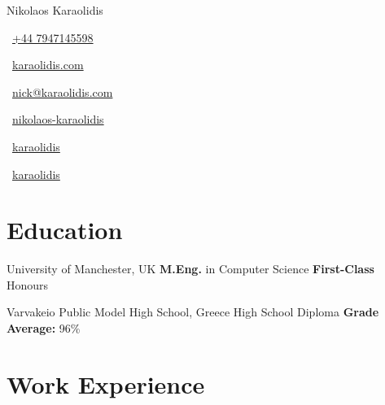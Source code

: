\documentclass[]{prometheus_cv}
\begin{document}
\thispagestyle{empty}
\pagestyle{fancy}

\centering

\begin{huge}
    Nikolaos Karaolidis
\end{huge}

\begin{footnotesize}
    \begin{tiny}\faMobile*\end{tiny}~\href{tel:+447947145598}{+44 7947145598}
    \quad
    \begin{tiny}\faHome\end{tiny}~\href{www.karaolidis.com}{karaolidis.com}
    \quad
    \begin{tiny}\faEnvelope\end{tiny}~\href{mailto:nick@karaolidis.com}{nick@karaolidis.com}
    \quad
    \begin{tiny}\faLinkedinIn\end{tiny}~\href{https://www.linkedin.com/in/nikolaos-karaolidis/}{nikolaos-karaolidis}
    \quad
    \begin{tiny}\faGitlab\end{tiny}~\href{https://git.karaolidis.com/karaolidis}{karaolidis}
    \quad
    \begin{tiny}\faGithub\end{tiny}~\href{https://github.com/karaolidis}{karaolidis}
\end{footnotesize}

\section{Education}

{University of Manchester, UK}
{\textbf{M.Eng.} in Computer Science}
{\textbf{First-Class} Honours}

{Varvakeio Public Model High School, Greece}
{High School Diploma}
{\textbf{ Grade Average:} 96\%}

\section{Work Experience}
\end{document}
